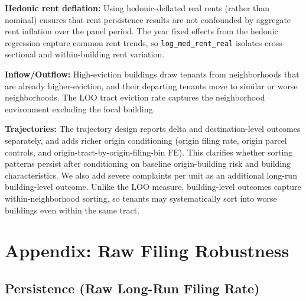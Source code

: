\documentclass[
  11pt,
]{article}
\begin{document}
\textbf{Hedonic rent deflation:} Using hedonic-deflated real rents
(rather than nominal) ensures that rent persistence results are not
confounded by aggregate rent inflation over the panel period. The year
fixed effects from the hedonic regression capture common rent trends, so
\texttt{log\_med\_rent\_real} isolates cross-sectional and
within-building rent variation.

\textbf{Inflow/Outflow:} High-eviction buildings draw tenants from
neighborhoods that are already higher-eviction, and their departing
tenants move to similar or worse neighborhoods. The LOO tract eviction
rate captures the neighborhood environment excluding the focal building.

\textbf{Trajectories:} The trajectory design reports delta and
destination-level outcomes separately, and adds richer origin
conditioning (origin filing rate, origin parcel controls, and
origin-tract-by-origin-filing-bin FE). This clarifies whether sorting
patterns persist after conditioning on baseline origin-building risk and
building characteristics. We also add severe complaints per unit as an
additional long-run building-level outcome. Unlike the LOO measure,
building-level outcomes capture within-neighborhood sorting, so tenants
may systematically sort into worse buildings even within the same tract.

\section{Appendix: Raw Filing
Robustness}\label{appendix-raw-filing-robustness}

\subsection{Persistence (Raw Long-Run Filing
Rate)}\label{persistence-raw-long-run-filing-rate}
\end{document}
